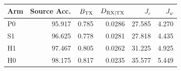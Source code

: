 \begin{tabular}{lrrrrr}
\toprule Arm & Source Acc. & $B_{\rm TX}$ & $D_{\rm RX|TX}$ & $J_c$ & $J_w$\\
\midrule
P0 & 95.917 & 0.785 & 0.0286 & 27.585 & 4.270\\
S1 & 96.625 & 0.778 & 0.0281 & 27.818 & 4.435\\
H1 & 97.467 & 0.805 & 0.0262 & 31.225 & 4.925\\
H0 & 98.175 & 0.817 & 0.0235 & 35.577 & 5.449\\
\bottomrule
\end{tabular}

